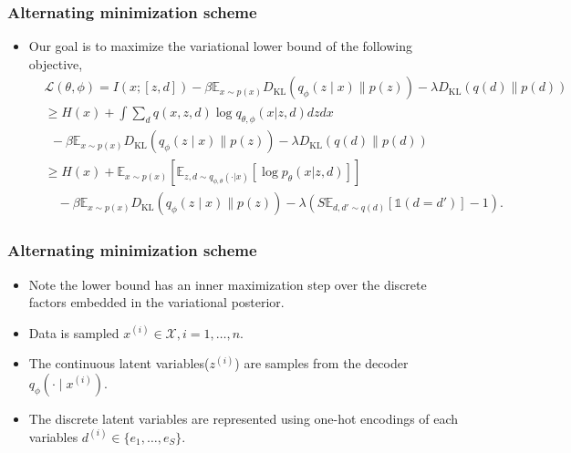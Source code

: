 \documentclass[10pt,mathserif]{beamer}
\begin{document}
\begin{frame}
\frametitle{Alternating minimization scheme}
    \begin{itemize}
\item Our goal is to maximize the variational lower bound of the following objective,
\small
\begin{align}
&\mathcal{L}(\theta,\phi)=I(x; [z,d]) - \beta \mathbb{E}_{x\sim p(x)} D_\text{KL}(q_\phi(z \mid x) \parallel p(z))-\lambda D_\text{KL} (q(d) \parallel p(d))\nonumber\\
& \geq H(x)+\int \sum_d q(x,z,d) \log q_{\theta, \phi}(x|z,d) dz dx\nonumber\\
&~~-\beta \mathbb{E}_{x\sim p(x)} D_\text{KL}(q_\phi(z \mid x) \parallel p(z)) - \lambda D_\text{KL} (q(d) \parallel p(d))\nonumber\\
&\geq H(x)+\mathbb{E}_{x\sim p(x)}[\mathbb{E}_{z,d\sim q_{\phi, \theta}(\cdot | x)}[\log p_{\theta}(x|z,d)]]\nonumber\\
&\quad-\beta \mathbb{E}_{x\sim p(x)} D_\text{KL}(q_\phi(z \mid x) \parallel p(z))- \lambda (S\mathbb{E}_{d, d' \sim q(d)}[\mathds{1}(d=d')]-1).\nonumber
\end{align}
    \end{itemize}
\end{frame}

\begin{frame}
\frametitle{Alternating minimization scheme}
\begin{itemize}\itemsep=12pt
\item Note the lower bound has an inner maximization step over the discrete factors embedded in the variational posterior.
\item Data is sampled $x^{(i)} \in \mathcal{X}, i=1, \ldots, n$.
\item The continuous latent variables($z^{(i)}$) are samples from the decoder $q_\phi(\cdot \mid x^{(i)})$. 
\item The discrete latent variables are represented using one-hot encodings of each variables $d^{(i)} \in \{e_1, \ldots, e_S\}$.
\end{itemize}
\end{frame}
\end{document}
